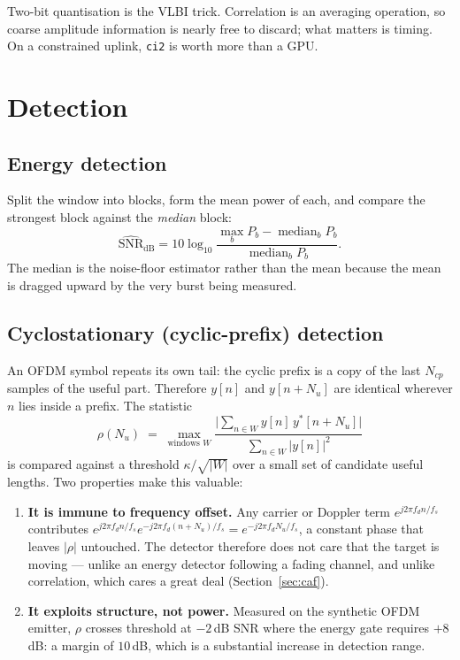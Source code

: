 \documentclass[11pt,a4paper]{article}
\newcommand{\code}[1]{\texttt{\small #1}}
\DeclareMathOperator{\median}{median}
\begin{document}
Two-bit quantisation is the VLBI trick. Correlation is an averaging
operation, so coarse amplitude information is nearly free to discard; what
matters is timing. On a constrained uplink, \code{ci2} is worth more than a
GPU.

\section{Detection}

\subsection{Energy detection}

Split the window into blocks, form the mean power of each, and compare the
strongest block against the \emph{median} block:
\begin{equation}
  \widehat{\text{SNR}}_{\text{dB}}
  = 10\log_{10}\frac{\max_b P_b - \median_b P_b}{\median_b P_b}.
\end{equation}
The median is the noise-floor estimator rather than the mean because the
mean is dragged upward by the very burst being measured.

\subsection{Cyclostationary (cyclic-prefix) detection}
\label{sec:cyclo}

An OFDM symbol repeats its own tail: the cyclic prefix is a copy of the last
$N_{cp}$ samples of the useful part. Therefore $y[n]$ and $y[n+N_u]$ are
identical wherever $n$ lies inside a prefix. The statistic
\begin{equation}
  \rho(N_u) \;=\; \max_{\text{windows }W}
  \frac{\bigl|\sum_{n\in W} y[n]\,y^{*}[n+N_u]\bigr|}
       {\sum_{n\in W} |y[n]|^{2}}
  \label{eq:cyclo}
\end{equation}
is compared against a threshold $\kappa/\sqrt{|W|}$ over a small set of
candidate useful lengths. Two properties make this valuable:

\begin{enumerate}[leftmargin=*]
\item \textbf{It is immune to frequency offset.} Any carrier or Doppler term
$e^{j2\pi f_d n/f_s}$ contributes
$e^{j2\pi f_d n/f_s}e^{-j2\pi f_d (n+N_u)/f_s}=e^{-j2\pi f_d N_u/f_s}$,
a constant phase that leaves $|\rho|$ untouched. The detector therefore does
not care that the target is moving --- unlike an energy detector following a
fading channel, and unlike correlation, which cares a great deal
(Section~\ref{sec:caf}).
\item \textbf{It exploits structure, not power.} Measured on the synthetic
OFDM emitter, $\rho$ crosses threshold at $-2$\,dB SNR where the energy gate
requires $+8$\,dB: a margin of $10$\,dB, which is a substantial increase in
detection range.
\end{enumerate}
\end{document}
